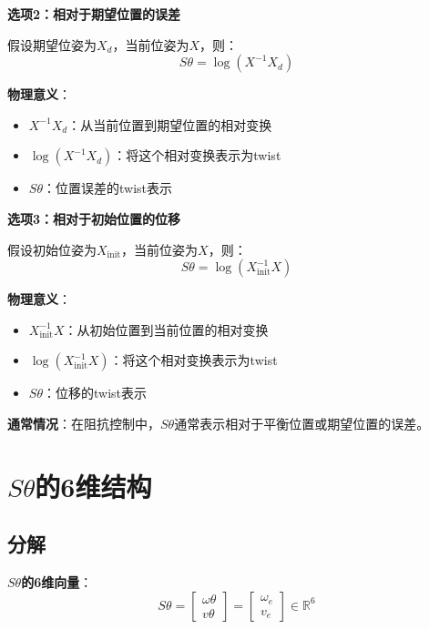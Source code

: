 \documentclass[12pt,a4paper]{article}
\begin{document}
\textbf{选项2：相对于期望位置的误差}

假设期望位姿为$X_d$，当前位姿为$X$，则：
\begin{equation}
S\theta = \log(X^{-1} X_d)
\end{equation}

\textbf{物理意义}：
\begin{itemize}
\item $X^{-1} X_d$：从当前位置到期望位置的相对变换
\item $\log(X^{-1} X_d)$：将这个相对变换表示为twist
\item $S\theta$：位置误差的twist表示
\end{itemize}

\textbf{选项3：相对于初始位置的位移}

假设初始位姿为$X_{\text{init}}$，当前位姿为$X$，则：
\begin{equation}
S\theta = \log(X_{\text{init}}^{-1} X)
\end{equation}

\textbf{物理意义}：
\begin{itemize}
\item $X_{\text{init}}^{-1} X$：从初始位置到当前位置的相对变换
\item $\log(X_{\text{init}}^{-1} X)$：将这个相对变换表示为twist
\item $S\theta$：位移的twist表示
\end{itemize}

\textbf{通常情况}：在阻抗控制中，$S\theta$通常表示相对于平衡位置或期望位置的误差。

\section{$S\theta$的6维结构}

\subsection{分解}

\textbf{$S\theta$的6维向量}：
\begin{equation}
S\theta = \begin{bmatrix} \omega\theta \\ v\theta \end{bmatrix} = \begin{bmatrix} \omega_e \\ v_e \end{bmatrix} \in \mathbb{R}^6
\end{equation}
\end{document}
